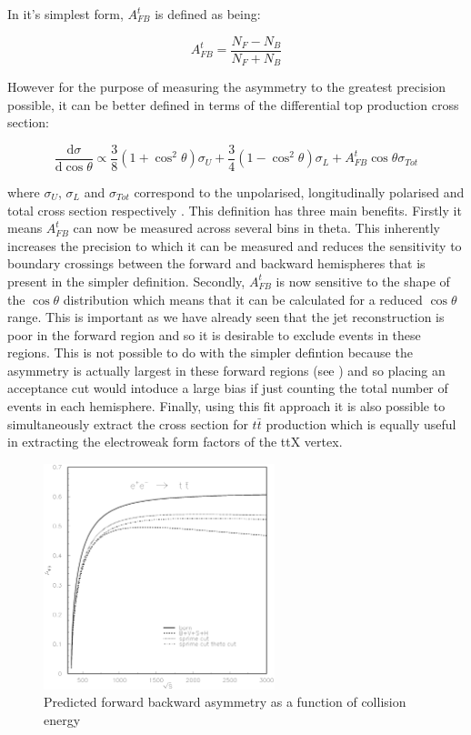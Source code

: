 In it's simplest form, $A_{FB}^t$ is defined as being:

\begin{equation}
A_{FB}^t=\frac{N_F-N_B}{N_F+N_B}
\end{equation}

However for the purpose of measuring the asymmetry to the greatest precision possible, it can be better defined in terms of the differential top production cross section:

\begin{equation}
  \label{eq:afbfit}
\frac{\mathrm{d}\sigma}{\mathrm{d}\cos\theta} \propto \frac{3}{8}(1+\cos^{2}\theta)\sigma_{U} + \frac{3}{4}(1-\cos^{2}\theta)\sigma_{L} + A_{FB}^{t}\cos\theta\sigma_{Tot}
\end{equation}

where $\sigma_U$, $\sigma_L$ and $\sigma_{Tot}$ correspond to the unpolarised, longitudinally polarised and total cross section respectively \cite{PhysRevD.25.1218}. This definition has three main benefits. Firstly it means $A_{FB}^t$ can now be measured across several bins in theta. This inherently increases the precision to which it can be measured and reduces the sensitivity to boundary crossings between the forward and backward hemispheres that is present in the simpler definition. Secondly, $A_{FB}^t$ is now sensitive to the shape of the $\cos\theta$ distribution which means that it can be calculated for a reduced $\cos\theta$ range. This is important as we have already seen that the jet reconstruction is poor in the forward region and so it is desirable to exclude events in these regions. This is not possible to do with the simpler defintion because the asymmetry is actually largest in these forward regions (see ) and so placing an acceptance cut would intoduce a large bias if just counting the total number of events in each hemisphere. Finally, using this fit approach it is also possible to simultaneously extract the cross section for $t\bar{t}$ production which is equally useful in extracting the electroweak form factors of the ttX vertex.

\begin{figure}
  \centering
  \includegraphics[width=0.6\textwidth]{TopAnalysis/figures/asym-top.eps}
  \caption[Predicted forward backward asymmetry as a function of collision energy]{Predicted forward backward asymmetry as a function of collision energy\cite{Fleischer:2003kk}}
  \label{fig:afbVEtheory}
\end{figure}

